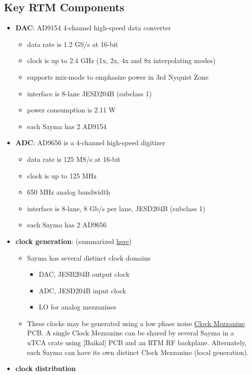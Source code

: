\subsection{Key RTM Components}\label{key-rtm-components}
\begin{itemize}

\item
  \textbf{DAC}: AD9154 4-channel high-speed data converter

  \begin{itemize}

  \item
    data rate is 1.2 GS/s at 16-bit
  \item
    clock is up to 2.4 GHz (1x, 2x, 4x and 8x interpolating modes)
  \item
    supports mix-mode to emphasize power in 3rd Nyquist Zone
  \item
    interface is 8-lane JESD204B (subclass 1)
  \item
    power consumption is 2.11 W
  \item
    each Sayma has 2 AD9154
  \end{itemize}
\item
  \textbf{ADC}: AD9656 is a 4-channel high-speed digitizer

  \begin{itemize}

  \item
    data rate is 125 MS/s at 16-bit
  \item
    clock is up to 125 MHz
  \item
    650 MHz analog bandwidth
  \item
    interface is 8-lane, 8 Gb/s per lane, JESD204B (subclass 1)
  \item
    each Sayma has 2 AD9656
  \end{itemize}
\item
  \textbf{clock generation}: (summarized \href{SinaraClocking}{here})

  \begin{itemize}

  \item
    Sayma has several distinct clock domains

    \begin{itemize}

    \item
      DAC, JESB204B output clock
    \item
      ADC, JESD204B input clock
    \item
      LO for analog mezzanines
    \end{itemize}
  \item
    These clocks may be generated using a low phase noise
    \href{ClockMezzanines}{Clock Mezzanine} PCB. A single Clock
    Mezzanine can be shared by several Sayma in a uTCA crate using
    {[}Baikal{]} PCB and an RTM RF backplane. Alternately, each Sayma
    can have its own distinct Clock Mezzanine (local generation).
  \end{itemize}
\item
  \textbf{clock distribution}


\end{itemize}
